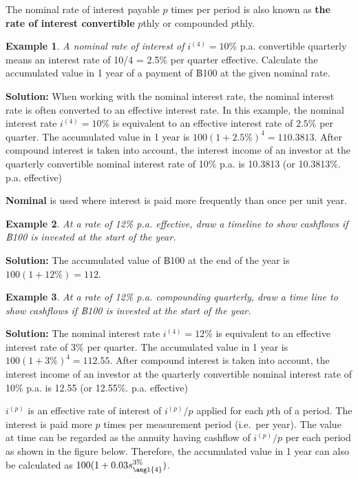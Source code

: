 \documentclass[
]{book}
\theoremstyle{definition}
\theoremstyle{definition}
\newtheorem{example}{Example}[chapter]
\theoremstyle{definition}
\theoremstyle{definition}
\theoremstyle{remark}
\begin{document}
The nominal rate of interest payable \(p\) times per period is also known
as \textbf{the rate of interest convertible} \(p\)thly or compounded \(p\)thly.

\begin{example}
\emph{A nominal rate of interest of} \(i^{(4)} = 10\%\) p.a. convertible
quarterly means an interest rate of 10/4 = 2.5\% per quarter effective.
Calculate the accumulated value in 1 year of a payment of ฿100 at the
given nominal rate.
\end{example}

\textbf{Solution:} When working with the nominal interest rate, the nominal
interest rate is often converted to an effective interest rate. In this
example, the nominal interest rate \(i^{(4)} = 10\%\) is equivalent to an
effective interest rate of \(2.5\%\) per quarter. The accumulated value in
1 year is \(100 (1 + 2.5\%)^4 = 110.3813\). After compound interest is
taken into account, the interest income of an investor at the quarterly
convertible nominal interest rate of 10\% p.a. is 10.3813 (or 10.3813\%.
p.a. effective)

\textbf{Nominal} is used where interest is paid more frequently than once per
unit year.

\begin{example}
\emph{At a rate of 12\% p.a. effective, draw a timeline to show cashflows if
฿100 is invested at the start of the year.}
\end{example}

\textbf{Solution:} The accumulated value of ฿100 at the end of the year is
\(100 (1 + 12\%) = 112\).

\begin{example}
\emph{At a rate of 12\% p.a. compounding quarterly, draw a time line to show
cashflows if ฿100 is invested at the start of the year.}
\end{example}

\textbf{Solution:} The nominal interest rate \(i^{(4)} = 12\%\) is equivalent
to an effective interest rate of \(3\%\) per quarter. The accumulated
value in 1 year is \(100 (1 + 3\%)^4 = 112.55\). After compound interest
is taken into account, the interest income of an investor at the
quarterly convertible nominal interest rate of 10\% p.a. is 12.55 (or
12.55\%. p.a. effective)

\(i^{(p)}\) is an effective rate of interest of \(i^{(p)}/p\) applied for
each \(p\)th of a period. The interest is paid more \(p\) times per
measurement period (i.e.~per year). The value at time can be regarded as
the annuity having cashflow of \(i^{(p)}/p\) per each period as shown in
the figure below. Therefore, the accumulated value in 1 year can also be
calculated as \(100( 1 + 0.03 s_{\angl{4}}^{3\%})\).
\end{document}
